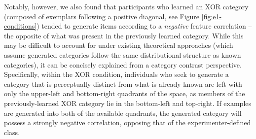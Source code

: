 \documentclass[12pt]{article}
\begin{document}
\begin{flushleft}

Notably, however, we also found that participants who learned an XOR category (composed of exemplars following a positive diagonal, see Figure \ref{fig:e1-conditions}) tended to generate items according to a {\em negative} feature correlation -- the opposite of what was present in the previously learned category. While this may be difficult to account for under existing theoretical approaches (which assume generated categories follow the same distributional structure as known categories), it can be concisely explained from a category contrast perspective. Specifically, within the XOR condition, individuals who seek to generate a category that is perceptually distinct from what is already known are left with only the upper-left and bottom-right quadrants of the space, as members of the previously-learned XOR category lie in the bottom-left and top-right. If examples are generated into both of the available quadrants, the generated category will possess a strongly negative correlation, opposing that of the experimenter-defined class.




\end{flushleft}
\end{document}
